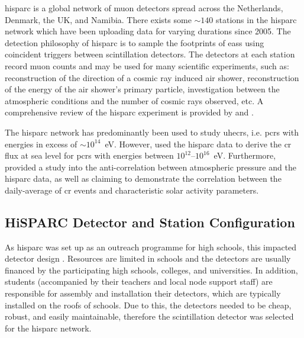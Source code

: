 \gls{hisparc} is a global network of muon detectors spread across the Netherlands, Denmark, the UK, and Namibia. There exists some $\sim140$ stations in the \gls{hisparc} network \citep{van_dam_hisparc_2020} which have been uploading data for varying durations since 2005. The detection philosophy of \gls{hisparc} is to sample the footprints of \glspl{eas} using coincident triggers between scintillation detectors. The detectors at each station record muon counts and may be used for many scientific experiments, such as: reconstruction of the direction of a cosmic ray induced air shower, reconstruction of the energy of the air shower's primary particle, investigation between the atmospheric conditions and the number of cosmic rays observed, etc. A comprehensive review of the \gls{hisparc} experiment is provided by \citet{fokkema_hisparc_2012} and \citet{van_dam_hisparc_2020}.

The \gls{hisparc} network has predominantly been used to study \glspl{uhecr}, i.e. \glspl{pcr} with energies in excess of $\sim10^{14}$~eV. However, \citet{van_dam_probing_2020} used the \gls{hisparc} data to derive the \gls{cr} flux at sea level for \glspl{pcr} with energies between $10^{12}$--$10^{16}$~eV. Furthermore, \citet{fan_analysis_2018} provided a study into the anti-correlation between atmospheric pressure and the \gls{hisparc} data, as well as claiming to demonstrate the correlation between the daily-average of \gls{cr} events and characteristic solar activity parameters.



\subsection{HiSPARC Detector and Station Configuration}

As \gls{hisparc} was set up as an outreach programme for high schools, this impacted detector design \citet{fokkema_hisparc_2012, van_dam_hisparc_2020}. Resources are limited in schools and the detectors are usually financed by the participating high schools, colleges, and universities. In addition, students (accompanied by their teachers and local node support staff) are responsible for assembly and installation their detectors, which are typically installed on the roofs of schools. Due to this, the detectors needed to be cheap, robust, and easily maintainable, therefore the scintillation detector was selected for the \gls{hisparc} network.

